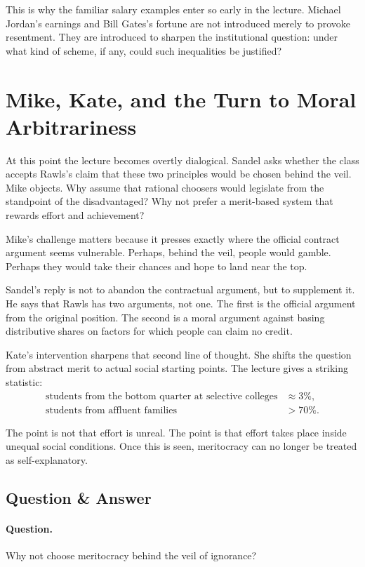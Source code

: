 This is why the familiar salary examples enter so early in the lecture. Michael Jordan's earnings and Bill Gates's fortune are not introduced merely to provoke resentment. They are introduced to sharpen the institutional question: under what kind of scheme, if any, could such inequalities be justified?

\section{Mike, Kate, and the Turn to Moral Arbitrariness}

At this point the lecture becomes overtly dialogical. Sandel asks whether the class accepts Rawls's claim that these two principles would be chosen behind the veil. Mike objects. Why assume that rational choosers would legislate from the standpoint of the disadvantaged? Why not prefer a merit-based system that rewards effort and achievement?

Mike's challenge matters because it presses exactly where the official contract argument seems vulnerable. Perhaps, behind the veil, people would gamble. Perhaps they would take their chances and hope to land near the top.

Sandel's reply is not to abandon the contractual argument, but to supplement it. He says that Rawls has two arguments, not one. The first is the official argument from the original position. The second is a moral argument against basing distributive shares on factors for which people can claim no credit.

Kate's intervention sharpens that second line of thought. She shifts the question from abstract merit to actual social starting points. The lecture gives a striking statistic:
\begin{align}
\text{students from the bottom quarter at selective colleges} &\approx 3\%,\\
\text{students from affluent families} &> 70\%.
\end{align}

The point is not that effort is unreal. The point is that effort takes place inside unequal social conditions. Once this is seen, meritocracy can no longer be treated as self-explanatory.

\subsection{Question \& Answer}

\paragraph{Question.} Why not choose meritocracy behind the veil of ignorance?


